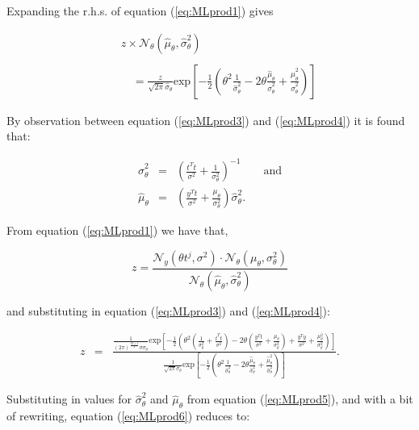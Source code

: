 Expanding the r.h.s. of equation (\ref{eq:MLprod1}) gives

\begin{eqnarray}\label{eq:MLprod4}
& & z \times \mathcal{N}_\theta(\hat{\mu}_\theta,\hat{\sigma}^2_\theta) \\\nonumber{}\\\nonumber
& & \quad = \frac{z}{\sqrt{2 \pi}\hat{\sigma}_\theta}\textrm{exp}\left[-\frac{1}{2}\left(\theta^2\frac{1}{\hat{\sigma}^2_\theta} - 2\theta\frac{\hat{\mu}_\theta}{\hat{\sigma}^2_\theta} + \frac{\hat{\mu}_\theta^2}{\hat{\sigma}^2_\theta}  \right)\right]
\end{eqnarray}

By observation between equation (\ref{eq:MLprod3}) and (\ref{eq:MLprod4}) it is found that:

\begin{eqnarray}
\label{eq:MLprod5}
\hat{\sigma}^2_\theta &=& \left(\frac{t^T t}{\sigma^2} + \frac{1}{\sigma_\theta^2}\right)^{-1} \qquad \textrm{and}\\\nonumber
\hat{\mu}_\theta &=& \left(\frac{y^T t}{\sigma^2} + \frac{\mu_\theta}{\sigma^2_\theta}\right)\hat{\sigma}^2_\theta.
\end{eqnarray}

From equation (\ref{eq:MLprod1}) we have that,

\begin{equation}\label{eq:MLprod2}
z = \frac{\mathcal{N}_y(\theta t^j,\sigma^2)\cdot\mathcal{N}_\theta(\mu_\theta,\sigma^2_\theta)}{\mathcal{N}_\theta(\hat{\mu}_\theta,\hat{\sigma}^2_\theta)}
\end{equation}

and substituting in equation (\ref{eq:MLprod3}) and (\ref{eq:MLprod4}):

\begin{eqnarray}\label{eq:MLprod6}
z &=& \frac{\frac{1}{\left(2\pi\right)^{\frac{M+1}{2}} \sigma \sigma_\theta} \textrm{exp}\left[-\frac{1}{2}\left(\theta^2 \left(\frac{1}{\sigma_\theta^2}+\frac{t^T t}{\sigma^2}\right) - 2\theta\left(\frac{y^T t}{\sigma^2}+\frac{\mu_\theta}{\sigma_\theta^2}\right) + \frac{y^T y}{\sigma^2} +\frac{\mu_\theta^2}{\sigma_\theta^2}\right)\right]}{\frac{1}{\sqrt{2 \pi}\hat{\sigma}_\theta}\textrm{exp}\left[-\frac{1}{2}\left(\theta^2\frac{1}{\hat{\sigma}^2_\theta} - 2\theta\frac{\hat{\mu}_\theta}{\hat{\sigma}^2_\theta} + \frac{\hat{\mu}_\theta^2}{\hat{\sigma}^2_\theta}  \right)\right]}.
\end{eqnarray}

Substituting in values for $\hat{\sigma}^2_\theta$ and $\hat{\mu}_\theta$ from equation (\ref{eq:MLprod5}), and with a bit of rewriting, equation (\ref{eq:MLprod6}) reduces to:

